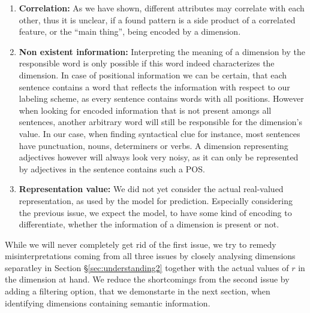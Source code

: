 \begin{enumerate}
\item \textbf{Correlation:} As we have shown, different attributes may correlate with each other, thus it is unclear, if a found pattern is a side product of a correlated feature, or the ``main thing'', being encoded by a dimension.  
\item \textbf{Non existent information:} Interpreting the meaning of a dimension by the responsible word is only possible if this word indeed characterizes the dimension. In case of positional information we can be certain, that each sentence contains a word that reflects the information with respect to our labeling scheme, as every sentence contains words with all positions. However when looking for encoded information that is not present amongs all sentences, another arbitrary word will still be responsible for the dimension's value. In our case, when finding syntactical clue for instance, most sentences have punctuation, nouns, determiners or verbs. A dimension representing adjectives however will always look very noisy, as it can only be represented by adjectives in the sentence contains such a \ac{POS}.
\item \textbf{Representation value:} We did not yet consider the actual real-valued representation, as used by the model for prediction. Especially considering the previous issue, we expect the model, to have some kind of encoding to differentiate, whether the information of a dimension is present or not.
\end{enumerate} 
While we will never completely get rid of the first issue, we try to remedy misinterpretations coming from all three issues by closely analysing dimensions separatley in Section §\ref{sec:understanding2} together with the actual values of $r$ in the dimension at hand. We reduce the shortcomings from the second issue by adding a filtering option, that we demonstarte in the next section, when identifying dimensions containing semantic information.

